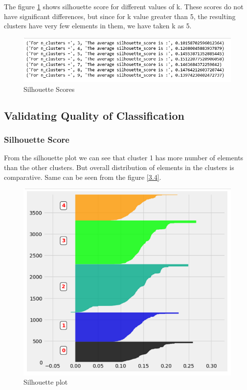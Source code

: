 The figure \ref{3.2} shows silhouette score for different values of k. These scores do not have significant differences, but since for k value greater than 5, the resulting clusters have very few elements in them, we have taken k as 5. 

\begin{figure}[H]
\caption{Silhouette Scores}
\label{3.2}
\centering
\includegraphics[width=\columnwidth]{images/3_2.PNG}
\end{figure}

\subsection{Validating Quality of Classification}

\subsubsection{\textbf{Silhouette Score}}

From the silhouette plot we can see that cluster 1 has more number of elements than the other clusters. But overall distribution of elements in the clusters is comparative. Same can be seen from the figure \ref{3.4}.

\begin{figure}[H]
\caption{Silhouette plot}
\label{3.3}
\centering
\includegraphics[width=\columnwidth]{images/3_3.PNG}
\end{figure}


